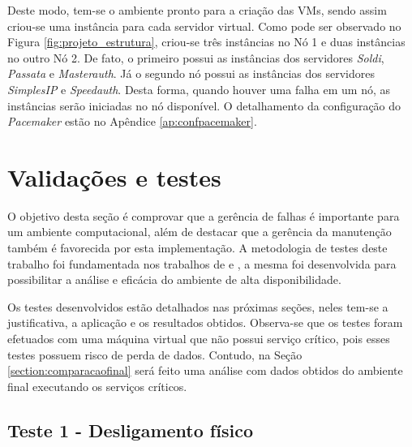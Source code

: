 
Deste modo, tem-se o ambiente pronto para a criação das \acp{VM}, sendo assim criou-se uma instância para cada servidor virtual. 
Como pode ser observado no Figura \ref{fig:projeto_estrutura}, criou-se três instâncias no Nó 1 e duas instâncias no outro Nó 2. De fato, o 
primeiro possui as instâncias dos servidores \textit{Soldi}, \textit{Passata} e \textit{Masterauth}. Já o segundo nó possui as instâncias dos 
servidores \textit{SimplesIP} e \textit{Speedauth}. Desta forma, quando houver uma falha em um nó, as instâncias serão iniciadas no nó disponível.
O detalhamento da configuração do \textit{Pacemaker} estão no Apêndice \ref{ap:confpacemaker}.


\section{Validações e testes}
\label{section:testes}

O objetivo desta seção é comprovar que a gerência de falhas é importante para um ambiente computacional, além de destacar que a gerência da 
manutenção também é favorecida por esta implementação.
A metodologia de testes deste trabalho foi fundamentada nos trabalhos de \citet{reis2009} e \citet{goncalves2009}, a mesma foi desenvolvida para 
possibilitar a análise e eficácia do ambiente de alta disponibilidade. 

Os testes desenvolvidos estão detalhados nas próximas seções, neles tem-se a justificativa, a aplicação e os resultados obtidos.
Observa-se que os testes foram efetuados com uma máquina virtual que não possui serviço crítico, pois esses testes possuem risco de perda de dados.
Contudo, na Seção \ref{section:comparacaofinal} será feito uma análise com dados obtidos do ambiente final executando os serviços críticos.

\subsection{Teste 1 - Desligamento físico}

